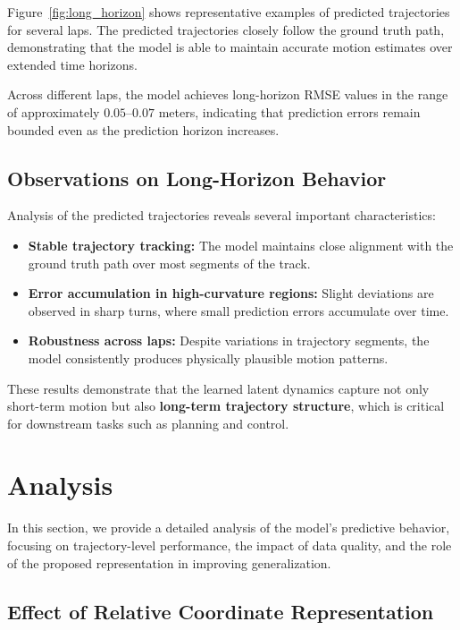 \documentclass[preprint,12pt]{elsarticle}
\begin{document}
Figure~\ref{fig:long_horizon} shows representative examples of predicted trajectories for several laps. The predicted trajectories closely follow the ground truth path, demonstrating that the model is able to maintain accurate motion estimates over extended time horizons.

Across different laps, the model achieves long-horizon RMSE values in the range of approximately $0.05$--$0.07$ meters, indicating that prediction errors remain bounded even as the prediction horizon increases.

\subsection{Observations on Long-Horizon Behavior}

Analysis of the predicted trajectories reveals several important characteristics:

\begin{itemize}
    \item \textbf{Stable trajectory tracking:} The model maintains close alignment with the ground truth path over most segments of the track.

    \item \textbf{Error accumulation in high-curvature regions:} Slight deviations are observed in sharp turns, where small prediction errors accumulate over time.

    \item \textbf{Robustness across laps:} Despite variations in trajectory segments, the model consistently produces physically plausible motion patterns.
\end{itemize}

These results demonstrate that the learned latent dynamics capture not only short-term motion but also \textbf{long-term trajectory structure}, which is critical for downstream tasks such as planning and control.

\section{Analysis}

In this section, we provide a detailed analysis of the model's predictive behavior, focusing on trajectory-level performance, the impact of data quality, and the role of the proposed representation in improving generalization.

\subsection{Effect of Relative Coordinate Representation}
\end{document}

